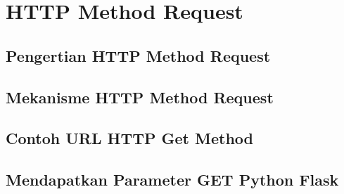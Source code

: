 \section{HTTP Method Request}
\subsection{Pengertian HTTP Method Request}
\subsection {Mekanisme HTTP Method Request}
\subsection {Contoh URL HTTP Get Method}
\subsection {Mendapatkan Parameter GET Python Flask}
